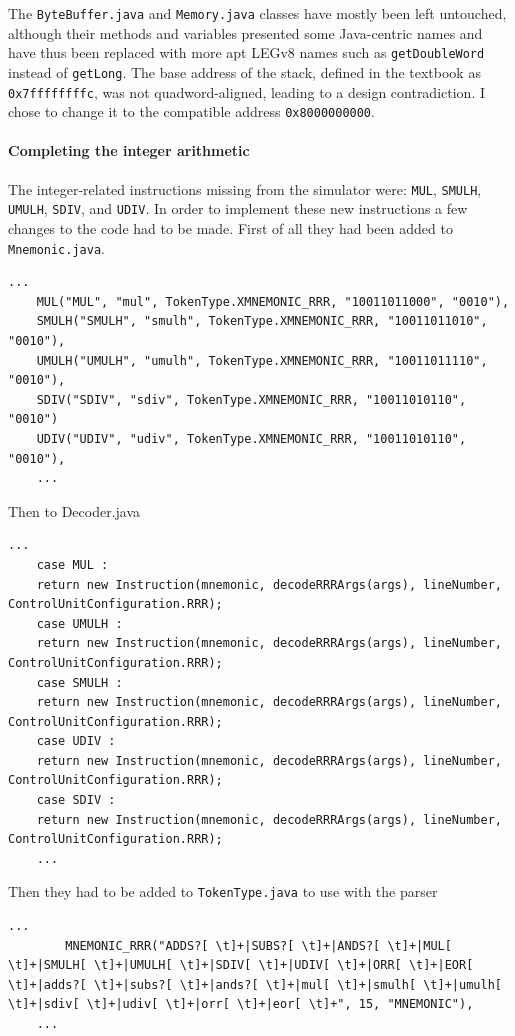 The \verb|ByteBuffer.java| and \verb|Memory.java| classes have mostly been left untouched, although their methods and variables presented some Java-centric names and have thus been replaced with more apt LEGv8 names such as \verb|getDoubleWord| instead of \verb|getLong|. The base address of the stack, defined in the textbook as \verb|0x7ffffffffc|,  was not quadword-aligned, leading to a design contradiction. I chose to change it to the  compatible address \verb|0x8000000000|.

\paragraph{Completing the integer arithmetic}

The integer-related instructions missing from the simulator were: \verb|MUL|, \verb|SMULH|, \verb|UMULH|, \verb|SDIV|, and \verb|UDIV|. In order to implement these new instructions a few changes to the code had to be made. First of all they had been added to \verb|Mnemonic.java|.
\begin{lstlisting}[caption={Added mnemonics}]
	...
	MUL("MUL", "mul", TokenType.XMNEMONIC_RRR, "10011011000", "0010"),
	SMULH("SMULH", "smulh", TokenType.XMNEMONIC_RRR, "10011011010", "0010"),
	UMULH("UMULH", "umulh", TokenType.XMNEMONIC_RRR, "10011011110", "0010"),
	SDIV("SDIV", "sdiv", TokenType.XMNEMONIC_RRR, "10011010110", "0010")
	UDIV("UDIV", "udiv", TokenType.XMNEMONIC_RRR, "10011010110", "0010"),
	...
\end{lstlisting}
Then to Decoder.java
\begin{lstlisting}[caption={Added instructions to the decoder}]
	...
	case MUL :
	return new Instruction(mnemonic, decodeRRRArgs(args), lineNumber, ControlUnitConfiguration.RRR);
	case UMULH :
	return new Instruction(mnemonic, decodeRRRArgs(args), lineNumber, ControlUnitConfiguration.RRR);
	case SMULH :
	return new Instruction(mnemonic, decodeRRRArgs(args), lineNumber, ControlUnitConfiguration.RRR);
	case UDIV :
	return new Instruction(mnemonic, decodeRRRArgs(args), lineNumber, ControlUnitConfiguration.RRR);
	case SDIV :
	return new Instruction(mnemonic, decodeRRRArgs(args), lineNumber, ControlUnitConfiguration.RRR);
	...
\end{lstlisting}
Then they had to be added to \verb|TokenType.java| to use with the parser
\begin{lstlisting}[caption={Addition to the parser}]
	...
		MNEMONIC_RRR("ADDS?[ \t]+|SUBS?[ \t]+|ANDS?[ \t]+|MUL[ \t]+|SMULH[ \t]+|UMULH[ \t]+|SDIV[ \t]+|UDIV[ \t]+|ORR[ \t]+|EOR[ \t]+|adds?[ \t]+|subs?[ \t]+|ands?[ \t]+|mul[ \t]+|smulh[ \t]+|umulh[ \t]+|sdiv[ \t]+|udiv[ \t]+|orr[ \t]+|eor[ \t]+", 15, "MNEMONIC"),
	...
\end{lstlisting}
